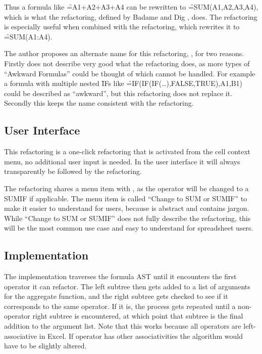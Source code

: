Thus a formula like \f{=A1+A2+A3+A4} can be rewritten to \f{=SUM(A1,A2,A3,A4)}, which is what the  refactoring, defined by Badame and Dig \cite{badame2012refactoring}, does.
The refactoring is especially useful when combined with the  refactoring, which rewrites it to \f{=SUM(A1:A4)}.

The author proposes an alternate name for this refactoring, , for two reasons.
Firstly  does not describe very good what the refactoring does, as more types of ``Awkward Formulas'' could be thought of which cannot be handled.
For example a formula with multiple nested \f{IF}s like \f{=IF(IF(IF(\ldots),FALSE,TRUE),A1,B1)} could be described as ``awkward'', but this refactoring does not replace it.
Secondly this keeps the name consistent with the  refactoring.

\subsection{User Interface}

This refactoring is a one-click refactoring that is activated from the cell context menu, no additional user input is needed.
In the user interface it will always transparently be followed by the  refactoring.

The refactoring shares a menu item with , as the operator will be changed to a SUMIF if applicable.
The menu item is called ``Change to SUM or SUMIF'' to make it easier to understand for users, because  is abstract and contains jargon.
While ``Change to SUM or SUMIF'' does not fully describe the refactoring, this will be the most common use case and easy to understand for spreadsheet users.

\subsection{Implementation}

The implementation traverses the formula AST until it encounters the first operator it can refactor.
The left subtree then gets added to a list of arguments for the aggregate function, and the right subtree gets checked to see if it corresponds to the same operator.
If it is, the process gets repeated until a non-operator right subtree is encountered, at which point that subtree is the final addition to the argument list.
Note that this works because all operators are left-associative in Excel.
If operator has other associativities the algorithm would have to be slightly altered.

